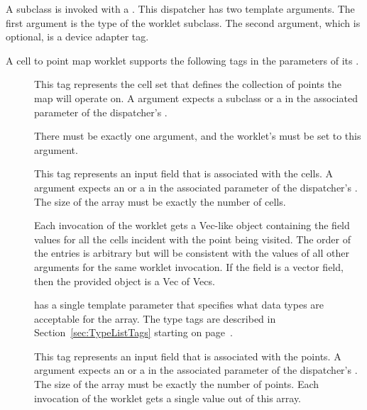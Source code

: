 A  subclass is invoked with a
. This dispatcher has two template
arguments. The first argument is the type of the worklet subclass. The
second argument, which is optional, is a device adapter tag.

A cell to point map worklet supports the following tags in the parameters
of its \controlsignature.

\begin{description}
\item[] This tag represents the cell set that defines
  the collection of points the map will operate on. A 
  argument expects a  subclass or a
   in the associated parameter of the
  dispatcher's .

  There must be exactly one  argument, and the worklet's
   must be set to this argument.

\item[] This tag represents an input field that is
  associated with the cells. A  argument expects an
   or a  in
  the associated parameter of the dispatcher's . The size
  of the array must be exactly the number of cells.

  Each invocation of the worklet gets a Vec-like object containing the
  field values for all the cells incident with the point being visited. The
  order of the entries is arbitrary but will be consistent with the values
  of all other  arguments for the same worklet
  invocation. If the field is a vector field, then the provided object is a
  Vec of Vecs.

   has a single template parameter that specifies what
  data types are acceptable for the array. The type tags are described in
  Section~\ref{sec:TypeListTags} starting on page~\pageref{TypeTagList}.

\item[] This tag represents an input field that is
  associated with the points. A  argument expects an
   or a  in
  the associated parameter of the dispatcher's . The size
  of the array must be exactly the number of points. Each invocation of the
  worklet gets a single value out of this array.


\end{description}
